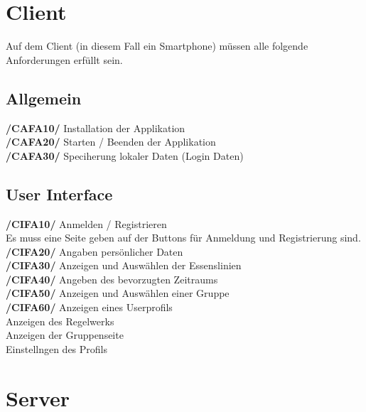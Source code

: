 \documentclass[a4paper]{scrreprt}
\begin{document}
\section{Client}
Auf dem Client (in diesem Fall ein Smartphone) müssen alle folgende Anforderungen erfüllt sein. 

\subsection{Allgemein}

\begin{addmargin}[25pt]{0pt} 
\textbf{/CAFA10/} Installation der Applikation \\
\textbf{/CAFA20/} Starten / Beenden der Applikation\\
\textbf{/CAFA30/} Speciherung lokaler Daten (Login Daten)\\
\end{addmargin}

\subsection{User Interface}

\begin{addmargin}[25pt]{0pt} 
\textbf{/CIFA10/} Anmelden / Registrieren \\
Es muss eine Seite geben auf der Buttons für Anmeldung und Registrierung sind.
\textbf{/CIFA20/} Angaben persönlicher Daten\\
\textbf{/CIFA30/} Anzeigen und Auswählen der Essenslinien\\
\textbf{/CIFA40/} Angeben des bevorzugten Zeitraums\\
\textbf{/CIFA50/} Anzeigen und Auswählen einer Gruppe\\
\textbf{/CIFA60/} Anzeigen eines Userprofils\\
Anzeigen des Regelwerks\\
Anzeigen der Gruppenseite\\
Einstellngen des Profils\\
\end{addmargin}

\section{Server}
\end{document}
